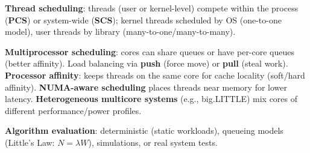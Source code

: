 \textbf{Thread scheduling}: threads (user or kernel-level) compete within the process (\textbf{PCS}) or system-wide (\textbf{SCS}); kernel threads scheduled by OS (one-to-one model), user threads by library (many-to-one/many-to-many).  

\textbf{Multiprocessor scheduling}: cores can share queues or have per-core queues (better affinity). Load balancing via \textbf{push} (force move) or \textbf{pull} (steal work). \textbf{Processor affinity}: keeps threads on the same core for cache locality (soft/hard affinity). \textbf{NUMA-aware scheduling} places threads near memory for lower latency. \textbf{Heterogeneous multicore systems} (e.g., big.LITTLE) mix cores of different performance/power profiles.

\textbf{Algorithm evaluation}: deterministic (static workloads), queueing models (Little's Law: $N=\lambda W$), simulations, or real system tests.